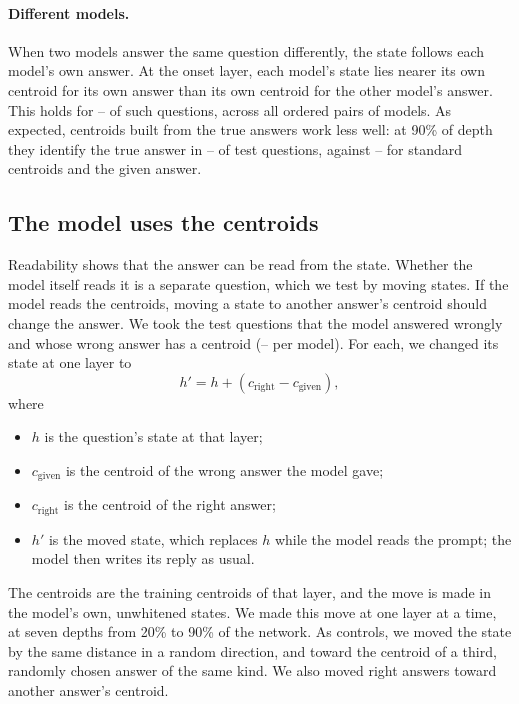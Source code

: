 \paragraph{Different models.} When two models answer the same question differently, the state follows each model's own answer. At the onset layer, each model's state lies nearer its own centroid for its own answer than its own centroid for the other model's answer. This holds for \CrossModelMin{}--\CrossModelMax{} of such questions, across all \CrossModelPairs{} ordered pairs of models. As expected, centroids built from the true answers work less well: at 90\% of depth they identify the true answer in \GoldLateMin{}--\GoldLateMax{} of test questions, against \GivenLateMin{}--\GivenLateMax{} for standard centroids and the given answer.

\subsection{The model uses the centroids}
\label{sec:steer}

Readability shows that the answer can be read from the state. Whether the model itself reads it is a separate question, which we test by moving states. If the model reads the centroids, moving a state to another answer's centroid should change the answer. We took the test questions that the model answered wrongly and whose wrong answer has a centroid (\PushNMin{}--\PushNMax{} per model). For each, we changed its state at one layer to
\begin{equation}
h' = h + \left(c_{\text{right}} - c_{\text{given}}\right),
\label{eq:move}
\end{equation}
where
\begin{itemize}\itemsep0pt
\item $h$ is the question's state at that layer;
\item $c_{\text{given}}$ is the centroid of the wrong answer the model gave;
\item $c_{\text{right}}$ is the centroid of the right answer;
\item $h'$ is the moved state, which replaces $h$ while the model reads the prompt; the model then writes its reply as usual.
\end{itemize}
The centroids are the training centroids of that layer, and the move is made in the model's own, unwhitened states. We made this move at one layer at a time, at seven depths from 20\% to 90\% of the network. As controls, we moved the state by the same distance in a random direction, and toward the centroid of a third, randomly chosen answer of the same kind. We also moved right answers toward another answer's centroid.

